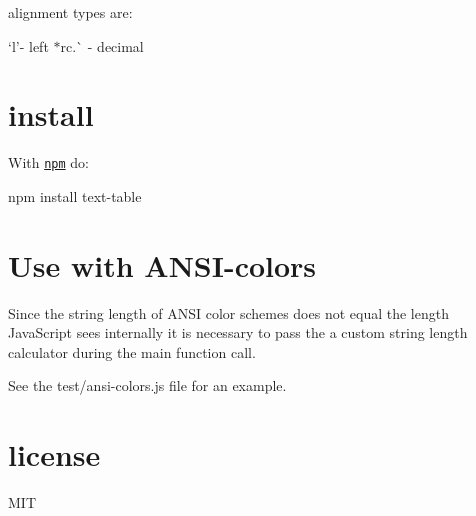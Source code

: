 alignment types are\+:


\begin{DoxyItemize}
\item `\textquotesingle{}l'{\ttfamily -\/ left $\ast$}\textquotesingle{}r\textquotesingle{}c\textquotesingle{}.\textquotesingle{}\`{} -\/ decimal
\end{DoxyItemize}

\section*{install}

With \href{https://npmjs.org}{\tt npm} do\+:


\begin{DoxyCode}
npm install text-table
\end{DoxyCode}


\section*{Use with A\+N\+S\+I-\/colors}

Since the string length of A\+N\+SI color schemes does not equal the length Java\+Script sees internally it is necessary to pass the a custom string length calculator during the main function call.

See the {\ttfamily test/ansi-\/colors.\+js} file for an example.

\section*{license}

M\+IT 